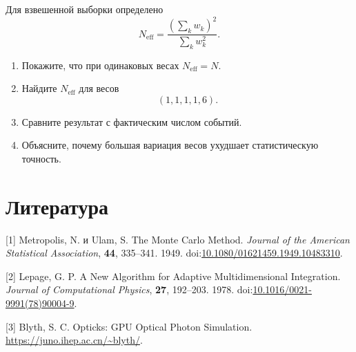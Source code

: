 \documentclass[
  russian,
  11pt,
  a4paper,
  open=any]{scrbook}
\newlength{\cslhangindent}
\newenvironment{CSLReferences}[2] %
 {\begin{list}{}{%
  \setlength{\itemindent}{0pt}
  \setlength{\leftmargin}{0pt}
  \setlength{\parsep}{0pt}
  \ifodd #1
   \setlength{\leftmargin}{\cslhangindent}
   \setlength{\itemindent}{-1\cslhangindent}
  \fi
  \setlength{\itemsep}{#2\baselineskip}}}
 {\end{list}}
\providecommand{\tightlist}{%
  \setlength{\itemsep}{0pt}\setlength{\parskip}{0pt}}
\begin{document}
\begin{semanticpdfbox}[colback=BookCoralSoft,borderline west={1.2mm}{0pt}{BookCoral}]

\par\nopagebreak[4]\vspace{1.2mm}

Для взвешенной выборки определено \[
N_{\mathrm{eff}}
=
\frac{(\sum_k w_k)^2}{\sum_k w_k^2}.
\]

\begin{enumerate}
\def\labelenumi{\arabic{enumi}.}
\tightlist
\item
  Покажите, что при одинаковых весах \(N_{\mathrm{eff}}=N\).
\item
  Найдите \(N_{\mathrm{eff}}\) для весов \[
  (1,1,1,1,6).
  \]
\item
  Сравните результат с фактическим числом событий.
\item
  Объясните, почему большая вариация весов ухудшает статистическую
  точность.
\end{enumerate}

\end{semanticpdfbox}

\section*{Литература}\label{ux43bux438ux442ux435ux440ux430ux442ux443ux440ux430-7}


\protect{}\label{refs}
\begin{CSLReferences}{0}{0}
{[}1{]} Metropolis, N. и Ulam, S. The {Monte Carlo} Method.
\emph{Journal of the American Statistical Association}, \textbf{44},
335--341. 1949.
doi:\href{https://doi.org/10.1080/01621459.1949.10483310}{10.1080/01621459.1949.10483310}.

{[}2{]} Lepage, G. P. A New Algorithm for Adaptive Multidimensional
Integration. \emph{Journal of Computational Physics}, \textbf{27},
192--203. 1978.
doi:\href{https://doi.org/10.1016/0021-9991(78)90004-9}{10.1016/0021-9991(78)90004-9}.

{[}3{]} Blyth, S. C. Opticks: {GPU} Optical Photon Simulation.
\url{https://juno.ihep.ac.cn/~blyth/}.

\end{CSLReferences}
\end{document}
